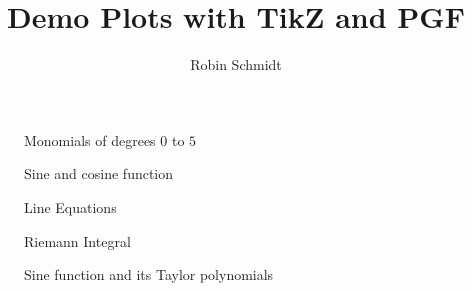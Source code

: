 



\title{Demo Plots with TikZ and PGF}
\author{Robin Schmidt}
\maketitle



\begin{figure}[h]
\centering
\caption{Monomials of degrees $0$ to $5$}
\label{Fig:Monomials}
\pgfplotsset{width=8cm} 

\end{figure}


\begin{figure}[h]
\centering
\caption{Sine and cosine function}
\label{Fig:SineAndCosine}

\end{figure}


\begin{figure}[h]
\centering
\caption{Line Equations}
\label{Fig:Line}

\end{figure}


\begin{figure}[h]
\centering
\caption{Riemann Integral}
\label{Fig:RiemannIntegral}

\end{figure}



\begin{figure}[h]
\centering
\caption{Sine function and its Taylor polynomials}
\label{Fig:TaylorExpansionSine}
\pgfplotsset{width=19cm,height=6cm}

\end{figure}

